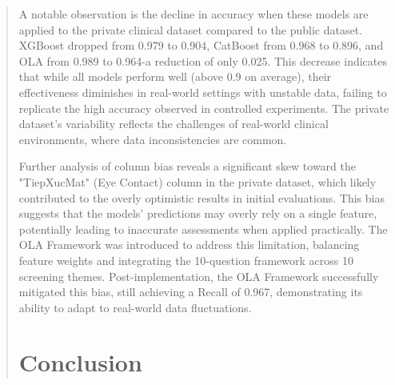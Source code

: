 \documentclass[runningheads]{llncs}
\begin{document}
\begin{abstract}
A notable observation is the decline in accuracy when these models are applied to the private clinical dataset compared to the public dataset. XGBoost dropped from 0.979 to 0.904, CatBoost from 0.968 to 0.896, and OLA from 0.989 to 0.964-a reduction of only 0.025. This decrease indicates that while all models perform well (above 0.9 on average), their effectiveness diminishes in real-world settings with unstable data, failing to replicate the high accuracy observed in controlled experiments. The private dataset's variability reflects the challenges of real-world clinical environments, where data inconsistencies are common.

Further analysis of column bias reveals a significant skew toward the "TiepXucMat" (Eye Contact) column in the private dataset, which likely contributed to the overly optimistic results in initial evaluations. This bias suggests that the models' predictions may overly rely on a single feature, potentially leading to inaccurate assessments when applied practically. The OLA Framework was introduced to address this limitation, balancing feature weights and integrating the 10-question framework across 10 screening themes. Post-implementation, the OLA Framework successfully mitigated this bias, still achieving a Recall of 0.967, demonstrating its ability to adapt to real-world data fluctuations.

\section{Conclusion}



\end{abstract}
\end{document}
